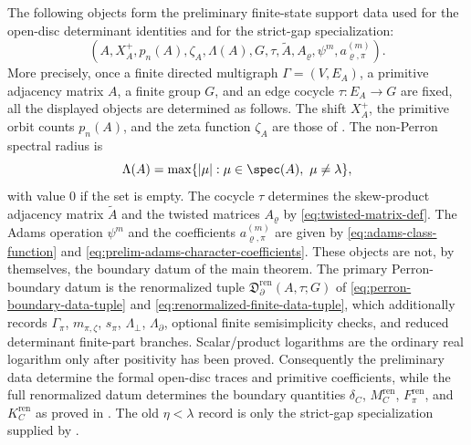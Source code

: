 \begin{remark}
  \label{prop:finite-state-data-collection}
  \label{prop:finite-state-data-package}
The following objects form the preliminary finite-state support data used
  for the open-disc determinant identities and for the strict-gap
  specialization:
  \[
    (A,X_A^+,p_n(A),\zeta_A,\Lambda(A),G,\tau,
      \widetilde A,A_\varrho,\psi^m,a_{\varrho,
      \pi}^{(m)}) .
  \]
  More precisely, once a finite directed multigraph \(\Gamma=(V,E_A)\),
  a primitive adjacency matrix \(A\), a finite group \(G\), and an edge
  cocycle \(\tau:E_A\to G\) are fixed, all the displayed objects are
  determined as follows. The shift \(X_A^+\), the primitive orbit counts
  \(p_n(A)\), and the zeta function \(\zeta_A\) are those of
  . The non-Perron spectral radius is
  \[
    \Lambda(A)=\max\{|\mu|:\mu\in\spec(A),\ \mu\neq\lambda\},
  \]
  with value \(0\) if the set is empty. The cocycle \(\tau\) determines
  the skew-product adjacency matrix \(\widetilde A\) and the twisted
  matrices \(A_\varrho\) by \eqref{eq:twisted-matrix-def}. The Adams
  operation \(\psi^m\) and the coefficients
  \(a_{\varrho,\pi}^{(m)}\) are given by
  \eqref{eq:adams-class-function} and
  \eqref{eq:prelim-adams-character-coefficients}. These objects are not,
  by themselves, the boundary datum of the main theorem.  The primary
  Perron-boundary datum is the renormalized tuple
  \(\mathfrak D_{\partial}^{\mathrm{ren}}(A,\tau;G)\) of
  \eqref{eq:perron-boundary-data-tuple} and
  \eqref{eq:renormalized-finite-data-tuple}, which additionally records
  \(\Gamma_\pi\), \(m_{\pi,\zeta}\), \(s_\pi\),
  \(\Lambda_\perp\), \(\Lambda_\partial\), optional finite semisimplicity
  checks, and reduced determinant finite-part branches.  Scalar/product
  logarithms are the ordinary real logarithm only after positivity has been
  proved.  Consequently the preliminary data determine the formal
  open-disc traces and primitive coefficients, while the full renormalized
  datum determines the boundary quantities
  \(\delta_C\), \(M_C^{\mathrm{ren}}\),
  \(F_\pi^{\mathrm{ren}}\), and \(K_C^{\mathrm{ren}}\) as proved in
  .  The old
  \(\eta<\lambda\) record is only the strict-gap specialization supplied by
  .
\end{remark}

